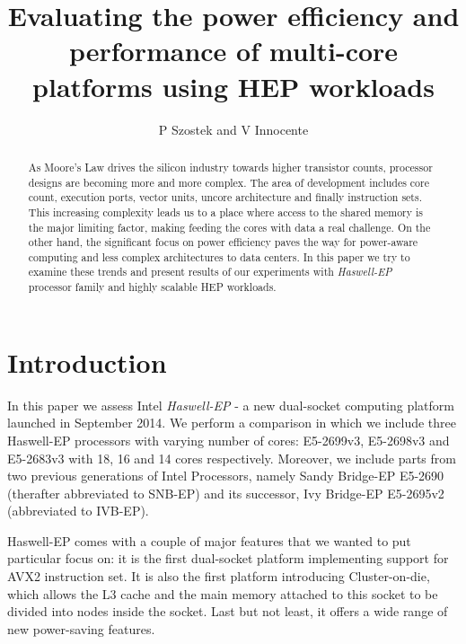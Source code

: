 \documentclass[a4paper]{jpconf}
\begin{document}
\title{Evaluating the power efficiency and performance of multi-core platforms using HEP workloads}
\author{P Szostek and V Innocente}
\address{CERN, Geneva 23, CH-1211, Switzerland}
\begin{abstract}
As Moore's Law drives the silicon industry towards higher transistor counts, processor designs are becoming more and more complex. The area of development includes core count, execution ports, vector units, uncore architecture and finally instruction sets. This increasing complexity leads us to a place where access to the shared memory is the major limiting factor, making feeding the cores with data a real challenge. On the other hand, the significant focus on power efficiency paves the way for power-aware computing and less complex architectures to data centers. In this paper we try to examine these trends and present results of our experiments with \textit{Haswell-EP} processor family and highly scalable HEP workloads.
\end{abstract}


\section{Introduction}
In this paper we assess Intel \textit{Haswell-EP} - a new dual-socket computing platform launched in September 2014. We perform a comparison in which we include three Haswell-EP processors with varying number of cores: E5-2699v3, E5-2698v3 and E5-2683v3 with 18, 16 and 14 cores respectively. Moreover, we include parts from two previous generations of Intel Processors, namely Sandy Bridge-EP E5-2690 (therafter abbreviated to SNB-EP) and its successor, Ivy Bridge-EP E5-2695v2 (abbreviated to IVB-EP).

Haswell-EP comes with a couple of major features that we wanted to put particular focus on: it is the first dual-socket platform implementing support for AVX2 instruction set. It is also the first platform introducing Cluster-on-die, which allows the L3 cache and the main memory attached to this socket to be divided into nodes inside the socket. Last but not least, it offers a wide range of new power-saving features.
\end{document}
